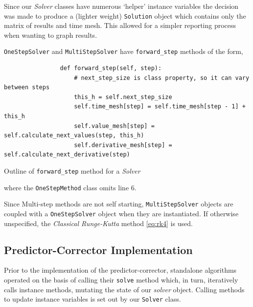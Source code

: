 \documentclass[12pt, twoside]{report}
\theoremstyle{plain}
\theoremstyle{definition}
\theoremstyle{definition}
\begin{document}
        Since our \textit{Solver} classes have numerous `helper' instance 
        variables the decision was made to produce a (lighter weight) 
        \texttt{Solution} object which contains only the matrix of
        results and time mesh. This allowed for a simpler reporting process
        when wanting to graph results.

        \texttt{OneStepSolver} and 
        \texttt{MultiStepSolver} have
        \texttt{forward_step} methods of the form,
        \begin{listing}[H]
            \begin{verbatim}
                def forward_step(self, step):
                    # next_step_size is class property, so it can vary between steps
                    this_h = self.next_step_size
                    self.time_mesh[step] = self.time_mesh[step - 1] + this_h
                    self.value_mesh[step] = self.calculate_next_values(step, this_h)
                    self.derivative_mesh[step] = self.calculate_next_derivative(step)
            \end{verbatim}
            \caption{Outline of \texttt{forward_step} method for 
                     a \textit{Solver}}
            \label{3_forward_step}
        \end{listing}
        \noindent where the \texttt{OneStepMethod} class omits 
        line 6.

        Since Multi-step methods are not self starting,
        \texttt{MultiStepSolver} objects are coupled with a 
        \texttt{OneStepSolver} object when they are instantiated. 
        If otherwise unspecified, the \textit{Classical Runge-Kutta} method 
        \eqref{eq:rk4} is used.



        \subsection{Predictor-Corrector Implementation}
            Prior to the implementation of the predictor-corrector, standalone 
            algorithms operated on the basis of calling their
            \texttt{solve} method which, in turn, iteratively calls
            instance methods, mutating the state of our \textit{solver} 
            object. Calling methods to update instance variables is set out by
            our \texttt{Solver} class.
\end{document}
